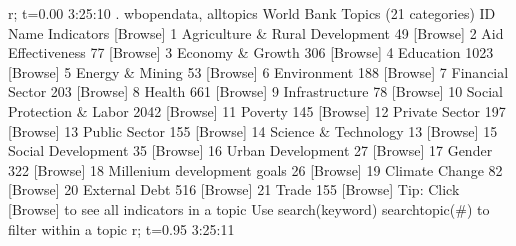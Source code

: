 r; t=0.00 3:25:10
{\smallskip}
. wbopendata, alltopics
{\smallskip}
World Bank Topics (21 categories)
  ID  Name                                         Indicators  [Browse]
   1  Agriculture \& Rural Development                      49  [Browse]
   2  Aid Effectiveness                                    77  [Browse]
   3  Economy \& Growth                                    306  [Browse]
   4  Education                                          1023  [Browse]
   5  Energy \& Mining                                      53  [Browse]
   6  Environment                                         188  [Browse]
   7  Financial Sector                                    203  [Browse]
   8  Health                                              661  [Browse]
   9  Infrastructure                                       78  [Browse]
  10  Social Protection \& Labor                          2042  [Browse]
  11  Poverty                                             145  [Browse]
  12  Private Sector                                      197  [Browse]
  13  Public Sector                                       155  [Browse]
  14  Science \& Technology                                 13  [Browse]
  15  Social Development                                   35  [Browse]
  16  Urban Development                                    27  [Browse]
  17  Gender                                              322  [Browse]
  18  Millenium development goals                          26  [Browse]
  19  Climate Change                                       82  [Browse]
  20  External Debt                                       516  [Browse]
  21  Trade                                               155  [Browse]
{\smallskip}
Tip: Click [Browse] to see all indicators in a topic
     Use search(keyword) searchtopic(\#) to filter within a topic
r; t=0.95 3:25:11
